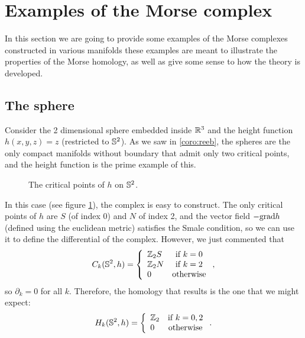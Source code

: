 \section{Examples of the Morse complex} \label{section:morse_examples}

In this section we are going to provide some examples of the Morse complexes constructed in various manifolds these examples are meant to illustrate the properties of the Morse homology, as well as give some sense to how the theory is developed.

\subsection{The sphere}

\begin{exmpl}
Consider the 2 dimensional sphere embedded inside $\mathbb{R}^3$ and the height function $h(x,y,z) = z$ (restricted to $\mathbb{S}^2$). As we saw in \ref{coro:reeb}, the spheres are the only compact manifolds without boundary that admit only two critical points, and the height function is the prime example of this.

\begin{figure}[h] \label{figure:example1}
	\centering
	
	\caption{The critical points of $h$ on $\mathbb{S}^2$.}
\end{figure}

In this case (see figure \ref{figure:example1}), the complex is easy to construct. The only critical points of $h$ are $S$ (of index 0) and $N$ of index 2, and the vector field $- \mathrm{grad} h$ (defined using the euclidean metric) satisfies the Smale condition, so we can use it to define the differential of the complex. However, we just commented that
\[C_k(\mathbb{S}^2,h) = \left\{ \begin{array}{lc} \mathbb{Z}_2 S & \text{if } k=0 \\ \mathbb{Z}_2 N & \text{if } k=2 \\ 0 & \text{otherwise} \end{array} \right. ,\]
so $\partial_k = 0$ for all $k$. Therefore, the homology that results is the one that we might expect:
\[H_k(\mathbb{S}^2,h) = \left\{ \begin{array}{lc} \mathbb{Z}_2 & \text{if } k=0,2 \\ 0 & \text{otherwise} \end{array} \right. .\]
\end{exmpl}

